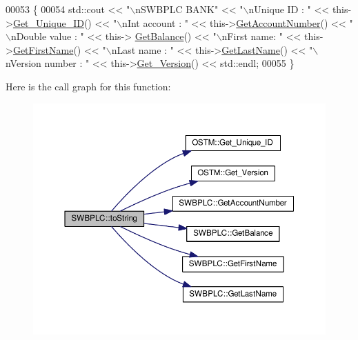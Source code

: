 \begin{DoxyCode}
00053 \{
00054      std::cout << \textcolor{stringliteral}{"\(\backslash\)nSWBPLC BANK"} << \textcolor{stringliteral}{"\(\backslash\)nUnique ID : "} << this->\hyperlink{class_o_s_t_m_a5a01a8b98d16b1d1904ecf9356e7b71d_a5a01a8b98d16b1d1904ecf9356e7b71d}{Get\_Unique\_ID}() << \textcolor{stringliteral}{"\(\backslash\)nInt
       account : "} << this->\hyperlink{class_s_w_b_p_l_c_a1a997f6d333e5021970e50605431d7df_a1a997f6d333e5021970e50605431d7df}{GetAccountNumber}() << \textcolor{stringliteral}{"\(\backslash\)nDouble value : "} << this->
      \hyperlink{class_s_w_b_p_l_c_af7f5f662ab926bfb9c0c1c7156cde24c_af7f5f662ab926bfb9c0c1c7156cde24c}{GetBalance}() << \textcolor{stringliteral}{"\(\backslash\)nFirst name: "} << this->\hyperlink{class_s_w_b_p_l_c_ace6bbcd6546896e581e3a2ee9504d090_ace6bbcd6546896e581e3a2ee9504d090}{GetFirstName}() << \textcolor{stringliteral}{"\(\backslash\)nLast name : "} << 
      this->\hyperlink{class_s_w_b_p_l_c_a72b2595acea28dae9e4f5816dd3c4652_a72b2595acea28dae9e4f5816dd3c4652}{GetLastName}()  << \textcolor{stringliteral}{"\(\backslash\)nVersion number : "} << this->\hyperlink{class_o_s_t_m_a1f1db9d482f22c8e7caa17dfb340626b_a1f1db9d482f22c8e7caa17dfb340626b}{Get\_Version}() << std::endl;
00055 \}
\end{DoxyCode}


Here is the call graph for this function\+:
\nopagebreak
\begin{figure}[H]
\begin{center}
\leavevmode
\includegraphics[width=350pt]{class_s_w_b_p_l_c_a761c77b5a204b4ae05ffb01bd602c3c2_a761c77b5a204b4ae05ffb01bd602c3c2_cgraph}
\end{center}
\end{figure}




